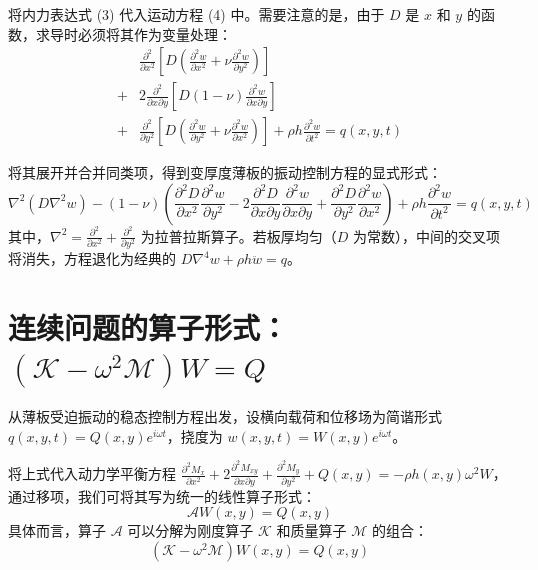 \documentclass[a4paper,12pt]{ctexart}
\begin{document}
将内力表达式 (3) 代入运动方程 (4) 中。需要注意的是，由于 $D$ 是 $x$ 和 $y$ 的函数，求导时必须将其作为变量处理：
\begin{equation}
    \begin{aligned}
        & \frac{\partial^2}{\partial x^2} \left[ D \left( \frac{\partial^2 w}{\partial x^2} + \nu \frac{\partial^2 w}{\partial y^2} \right) \right] \\
        + & 2 \frac{\partial^2}{\partial x \partial y} \left[ D (1-\nu) \frac{\partial^2 w}{\partial x \partial y} \right] \\
        + & \frac{\partial^2}{\partial y^2} \left[ D \left( \frac{\partial^2 w}{\partial y^2} + \nu \frac{\partial^2 w}{\partial x^2} \right) \right] + \rho h \frac{\partial^2 w}{\partial t^2} = q(x,y,t)
    \end{aligned}
\end{equation}

将其展开并合并同类项，得到变厚度薄板的振动控制方程的显式形式：
\begin{equation}
    \nabla^2 \left( D \nabla^2 w \right) - (1-\nu) \left( \frac{\partial^2 D}{\partial x^2}\frac{\partial^2 w}{\partial y^2} - 2\frac{\partial^2 D}{\partial x \partial y}\frac{\partial^2 w}{\partial x \partial y} + \frac{\partial^2 D}{\partial y^2}\frac{\partial^2 w}{\partial x^2} \right) + \rho h \frac{\partial^2 w}{\partial t^2} = q(x,y,t)
\end{equation}
其中，$\nabla^2 = \frac{\partial^2}{\partial x^2} + \frac{\partial^2}{\partial y^2}$ 为拉普拉斯算子。若板厚均匀（$D$ 为常数），中间的交叉项将消失，方程退化为经典的 $D\nabla^4 w + \rho h \ddot{w} = q$。

\section{连续问题的算子形式：$(\mathcal{K} - \omega^2 \mathcal{M})W = Q$}

从薄板受迫振动的稳态控制方程出发，设横向载荷和位移场为简谐形式 $q(x,y,t) = Q(x,y)e^{i\omega t}$，挠度为 $w(x,y,t) = W(x,y)e^{i\omega t}$。

将上式代入动力学平衡方程 $\frac{\partial^2 M_x}{\partial x^2} + 2\frac{\partial^2 M_{xy}}{\partial x \partial y} + \frac{\partial^2 M_y}{\partial y^2} + Q(x,y) = -\rho h(x,y) \omega^2 W$，通过移项，我们可将其写为统一的线性算子形式：
\begin{equation}
    \mathcal{A} W(x,y) = Q(x,y)
\end{equation}
具体而言，算子 $\mathcal{A}$ 可以分解为刚度算子 $\mathcal{K}$ 和质量算子 $\mathcal{M}$ 的组合：
\begin{equation}
    (\mathcal{K} - \omega^2 \mathcal{M}) W(x,y) = Q(x,y)
\end{equation}
\end{document}
